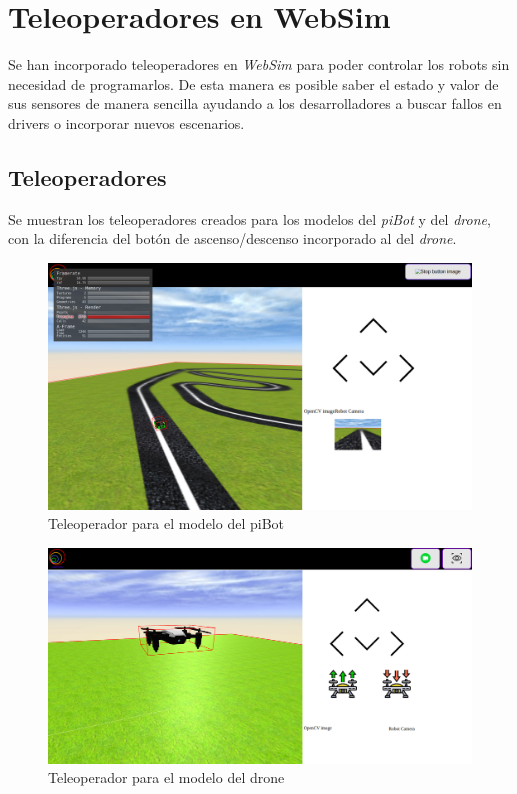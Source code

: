 \section{Teleoperadores en WebSim}
\label{sec:teleoperadores}

Se han incorporado teleoperadores en \textit{WebSim} para poder controlar los robots sin necesidad de programarlos. De esta manera es posible saber el estado y valor de sus sensores de manera sencilla ayudando a los desarrolladores a buscar fallos en drivers o incorporar nuevos escenarios. 

\subsection{Teleoperadores}


Se muestran los teleoperadores creados para los modelos del \textit{piBot} y del \textit{drone}, con la diferencia del botón de ascenso/descenso incorporado al del \textit{drone}.

\begin{figure}[H]
    \centering            \includegraphics[scale=0.25]{img/pibot_teleoperator.png}
    \caption{Teleoperador para el modelo del piBot} \label{fig:piBot_teleoperator}
\end{figure}

\begin{figure}[H]
    \centering
    \includegraphics[scale=0.25]{img/drone_teleoperator.png}
    \caption{Teleoperador para el modelo del drone} \label{fig:drone_teleoperator}
\end{figure}

